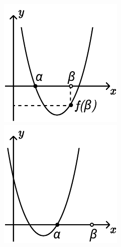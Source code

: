 \begin {figure} [h]
    \begin {minipage} [t] {0.3\linewidth}
        \centering
        \includegraphics [width=\linewidth] {images/image_03.pdf}
    \end {minipage}
    \hfill
    \begin {minipage} [t] {0.3\linewidth}
        \centering
        \includegraphics [width=\linewidth] {images/image_17.pdf}

\end{minipage}
\end{figure}
